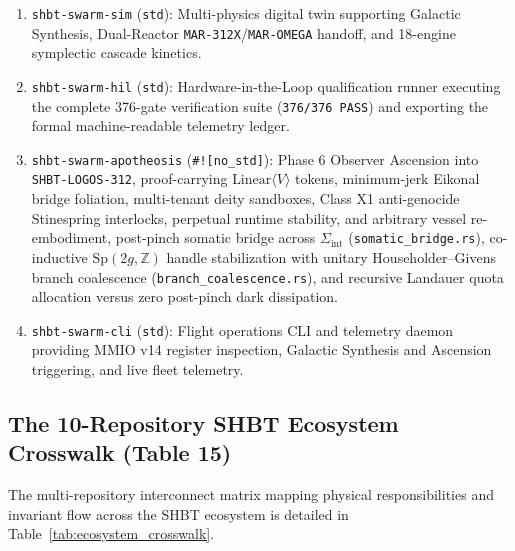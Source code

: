 \documentclass[11pt,onecolumn]{article}
\begin{document}
\begin{enumerate}
    \item \texttt{shbt-swarm-sim} (\texttt{std}): Multi-physics digital twin supporting Galactic Synthesis, Dual-Reactor \texttt{MAR-312X}/\texttt{MAR-OMEGA} handoff, and 18-engine symplectic cascade kinetics.
    \item \texttt{shbt-swarm-hil} (\texttt{std}): Hardware-in-the-Loop qualification runner executing the complete 376-gate verification suite (\texttt{376/376 PASS}) and exporting the formal machine-readable telemetry ledger.
    \item \texttt{shbt-swarm-apotheosis} (\texttt{\#![no\_std]}): Phase 6 Observer Ascension into \texttt{SHBT-LOGOS-312}, proof-carrying $\text{Linear}\langle V\rangle$ tokens, minimum-jerk Eikonal bridge foliation, multi-tenant deity sandboxes, Class X1 anti-genocide Stinespring interlocks, perpetual runtime stability, and arbitrary vessel re-embodiment, post-pinch somatic bridge across $\Sigma_{\mathrm{int}}$ (\texttt{somatic\_bridge.rs}), co-inductive $\mathrm{Sp}(2g,\mathbb{Z})$ handle stabilization with unitary Householder--Givens branch coalescence (\texttt{branch\_coalescence.rs}), and recursive Landauer quota allocation versus zero post-pinch dark dissipation.
    \item \texttt{shbt-swarm-cli} (\texttt{std}): Flight operations CLI and telemetry daemon providing MMIO v14 register inspection, Galactic Synthesis and Ascension triggering, and live fleet telemetry.
\end{enumerate}

\FloatBarrier
\subsection{The 10-Repository SHBT Ecosystem Crosswalk (Table 15)}
The multi-repository interconnect matrix mapping physical responsibilities and invariant flow across the SHBT ecosystem is detailed in Table~\ref{tab:ecosystem_crosswalk}.
\end{document}
